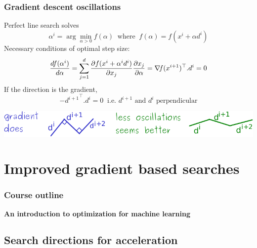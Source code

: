 \documentclass[12pt]{beamer}
\begin{document}
\begin{frame}
\frametitle{Gradient descent oscillations} 
Perfect line search solves
\begin{equation*}
\alpha^i = \arg\min_{\alpha>0} f(\alpha) ~\text{ where }~ f(\alpha) = f(x^i+\alpha d^i) 
\end{equation*}
Necessary conditions of optimal step size: 
\begin{equation*}
\frac{df(\alpha^i)}{d\alpha} = \sum_{j=1}^d \frac{\partial f(x^i + \alpha^i d^i)}{\partial x_j} \frac{\partial x_j}{\partial \alpha}
= \nabla\!{f}(x^{i+1})^\top . d^i = 0
\end{equation*}
If the direction is the gradient, 
\begin{equation*}
{-d^{i+1}}^\top . d^i = 0 ~\text{ i.e. } d^{i+1} \text{ and } d^i \text{ perpendicular}
\end{equation*}
\begin{center}
\includegraphics[width=\textwidth]{oscillations-crop.pdf} 
\end{center}
\end{frame}

\section{Improved gradient based searches}

\begin{frame}%
\frametitle{Course outline} 
\begin{center} \textbf{An introduction to optimization for machine learning} \end{center}
\tableofcontents[currentsection]
\end{frame}

\subsection{Search directions for acceleration}
\end{document}
